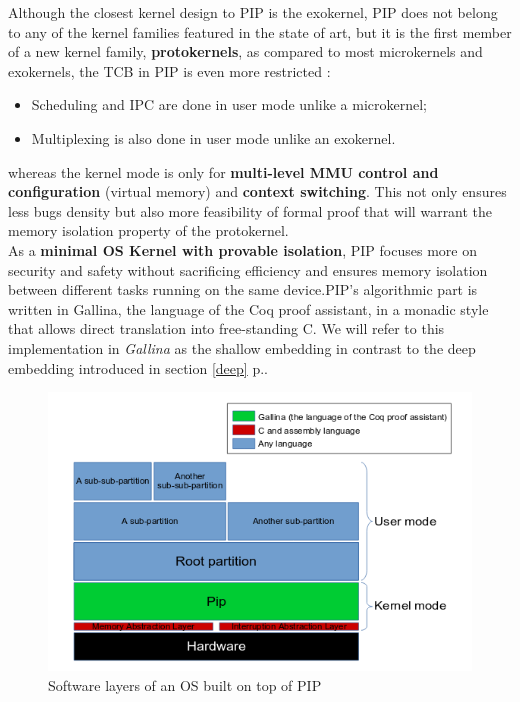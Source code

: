 \noindent Although the closest kernel design to PIP is the exokernel, PIP does not belong to any of the kernel families featured in the state of art, but it is the first member of a new kernel family, \textbf{protokernels}, as compared to most microkernels and exokernels, the TCB in PIP is even more restricted :
\begin{itemize}
	\item Scheduling and IPC are done in user mode unlike a microkernel;
	\item Multiplexing is also done in user mode unlike an exokernel.
\end{itemize}

\noindent whereas the kernel mode is only for \textbf{multi-level MMU control and configuration} (virtual memory) and \textbf{context switching}. This not only ensures less bugs density but also more feasibility of formal proof that will warrant the memory isolation property of the protokernel. \\

As a \textbf{minimal OS Kernel with provable isolation}, PIP focuses more on security and safety without sacrificing efficiency and ensures memory isolation between different tasks running on the same device.PIP's algorithmic part is written in Gallina, the language of the Coq proof assistant, in a monadic style that allows direct translation into free-standing C. We will refer to this implementation in \textit{Gallina} as the shallow embedding in contrast to the deep embedding introduced in section \ref{deep} p.\pageref{deep}. 

\begin{figure}[!ht]
	\centering 
	\includegraphics[width=\linewidth ,frame]{img/OSLayersPIP.png} 
	\caption{Software layers of an OS built on top of PIP}
\end{figure}

